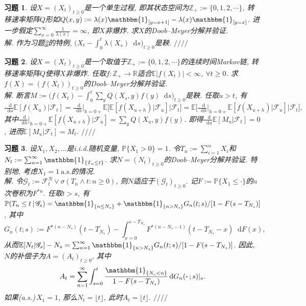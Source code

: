 \documentclass{ctexart}
\theoremstyle{definition}
\theoremstyle{remark}
\theoremstyle{plain}
\newtheorem{Ex}{习题}[section]
\newenvironment{Soln}{\vspace{1ex}\textbf{\\}{\color{red}\textit{解}}.\normalfont}{\color{red}\hfill$/\!/\!/\!/$\vspace{1ex}\par}
\newcommand{\1}{\mathbbm{1}}				%
\newcommand{\as}{\mathrm{a.s.}}				%
\renewcommand{\P}{\mathbb{P}}				%
\newcommand{\E}{\mathbb{E}}					%
\newcommand{\abs}[1]{\lvert#1\rvert}			%
\newcommand{\R}{\mathbb{R}}					%
\newcommand{\tint}{\textstyle\int\nolimits}
\newcommand{\tsum}{\textstyle\sum\nolimits}
\renewcommand*{\d}{\mathop{}\!\mathrm{d}}	%
\begin{document}
\begin{Ex}
设$X = (X_{t})_{t \ge 0}$是一个单生过程, 即其状态空间为$\mathbb{Z}_{+} := \{0,1,2,\cdots\}$, 转移速率矩阵$Q$形如$Q(x,y) := \lambda(x)\1_{[y=x+1]} -\lambda(x)\1_{[y=x]}$. 进一步假定$\sum_{x=0}^{\infty} \frac{1}{\lambda(x)} = \infty$, 即$X$非爆炸. 求$X$的Doob--Meyer分解并验证.
\begin{Soln}
作为习题\ref{Ex:Doob-Meyer_Markov}的特例, $\big( X_{t} - \int_{0}^{t} \lambda(X_{s}) \d s \big)_{t \ge 0}$是鞅.
\end{Soln}
\end{Ex}
\begin{Ex}\label{Ex:Doob-Meyer_Markov}
设$X = (X_{t})_{t \ge 0}$是一个取值于$\mathbb{Z}_{+} := \{0,1,2,\cdots\}$的连续时间Markov链, 转移速率矩阵$Q$使得$X$非爆炸. 任取$f : \mathbb{Z}_{+} \to \R$适合$\E\abs{f(X_{t})} < \infty$, $\forall t \ge 0$. 求$f(X) = (f(X_{t}))_{t \ge 0}$的Doob--Meyer分解并验证.
\begin{Soln}
断言$M := \big( f(X_{t}) - \int_{0}^{t} \sum_{y} Q(X_{s},y) f(y) \d s \big)_{t \ge 0}$是鞅. 任取$u > t$, 有
\[ \tfrac{\d}{\d u} \E[f(X_{u})|\mathscr{F}_{t}] = \tfrac{\d}{\d h} \big|_{h=0+} \E\big[ \E[f(X_{u+h})|\mathscr{F}_{u}] \big| \mathscr{F}_{t} \big] = \E\big[ \tfrac{\d}{\d h} \big|_{h=0+} \E[f(X_{u+h})|\mathscr{F}_{u}] \big| \mathscr{F}_{t} \big] , \]
其中$\tfrac{\d}{\d h} \big|_{h=0+} \E[f(X_{u+h})|\mathscr{F}_{u}] = \sum_{y} Q(X_{u},y) f(y)$. 即得$\tfrac{\d}{\d u} \E[M_{u}|\mathscr{F}_{t}] = 0$, 进而$\E[M_{u}|\mathscr{F}_{t}] = M_{t}$.
\end{Soln}
\end{Ex}


\begin{Ex}
设$X_{1},X_{2},\dots$是i.i.d.随机变量, $\P\{X_{1}>0\} = 1$. 令$T_{n} := \sum_{i=1}^{n} X_{i}$和$N_{t} := \sum_{n=1}^{\infty} \1_{\{T_{n} \le t\}}$. 求$N = (N_{t})_{t \ge 0}$的Doob--Meyer分解并验证. 特别地, 考虑$X_{1} = 1 ~\as$的情况.
\begin{Soln}
令$\mathscr{G}_{t} := \mathscr{F}_{t}^{N} \vee \sigma( T_{n}\wedge t : n \ge 0)$, 则$N$适应于$(\mathscr{G}_{t})_{t \ge 0}$. 记$F := \P\{ X_{1} \le \bm{\cdot} \}$的$n$次卷积为$F^{*n}$. 任取$t > s$, 有$\P( T_{n}\le t \,|\,\mathscr{G}_{s}) = \1_{\{n \le N_{s}\}} + \1_{\{n > N_{s}\}} G_{n}(t;s) / [1-F(s-T_{N_{s}})]$, 其中
\[ G_{n}(t;s) := F^{*(n-N_{s})}(t-T_{N_{s}}) - \tint_{x=0}^{s-T_{N_{s}}} F^{*(n-N_{s}-1)}(t-T_{N_{s}}-x) \d F(x) , \]
从而$\E[N_{t}|\mathscr{G}_{s}]-N_{s} = \tsum_{n=1}^{\infty} \1_{\{n>N_{s}\}} G_{n}(t;s) / [1-F(s-T_{N_{s}})]$. 因此, $N$的补偿子为$A = (A_{t})_{t \ge 0}$, 其中
\[ A_{t} = \sum_{n=1}^{\infty} \int_{s=0}^{t} \frac{\1_{\{N_{s}<n\}}}{1-F(s-T_{N_{s}})} \d G_{n}(\bm{\cdot}\,;s) |_{s} . \]
如果(a.s.)\,$X_{1} = 1$, 那么$N_{t} = \lfloor t \rfloor$, 此时$A_{t} = \lfloor t \rfloor$.
\end{Soln}
\end{Ex}
\end{document}

